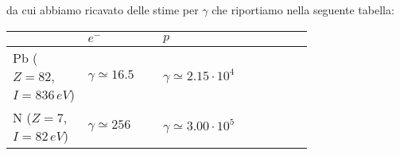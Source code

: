 \documentclass[twoside]{article}
\begin{document}
da cui abbiamo ricavato delle stime per $\gamma$ che riportiamo nella seguente tabella:
\begin{center}
    \begin{tabular}{|>{\centering}m{0.25\linewidth}|>{\centering}m{0.25\linewidth}|   >{\centering\arraybackslash}m{0.25\linewidth}|@{}m{0pt}@{}}
        \toprule
        & $e^-$ & $p$ \\[4pt]
        \hline \vspace{5pt}
        Pb  ($Z=82$, $I=836\,eV$) &  $\gamma\simeq16.5$ & $\gamma\simeq2.15\cdot10^4$\\[5pt]
        \hline \vspace{5pt}
        N  ($Z=7$, $I=82\,eV$) &  $\gamma\simeq256$ & $\gamma\simeq3.00\cdot10^5$\\[4pt]
        \bottomrule
    \end{tabular}
\end{center}
\end{document}
